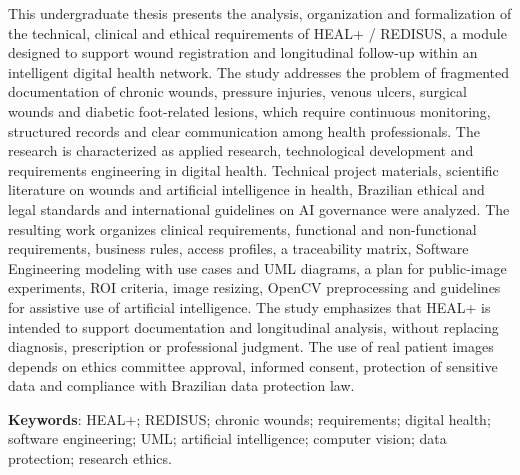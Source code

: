 \documentclass[
    12pt,
    oneside,
    a4paper,
    chapter=TITLE,
    brazil,
    sumario=tradicional,
    hidelinks
]{abntex2}
\begin{document}
\begin{resumo}[Abstract]
This undergraduate thesis presents the analysis, organization and formalization of the technical, clinical and ethical requirements of HEAL+ / REDISUS, a module designed to support wound registration and longitudinal follow-up within an intelligent digital health network. The study addresses the problem of fragmented documentation of chronic wounds, pressure injuries, venous ulcers, surgical wounds and diabetic foot-related lesions, which require continuous monitoring, structured records and clear communication among health professionals. The research is characterized as applied research, technological development and requirements engineering in digital health. Technical project materials, scientific literature on wounds and artificial intelligence in health, Brazilian ethical and legal standards and international guidelines on AI governance were analyzed. The resulting work organizes clinical requirements, functional and non-functional requirements, business rules, access profiles, a traceability matrix, Software Engineering modeling with use cases and UML diagrams, a plan for public-image experiments, ROI criteria, image resizing, OpenCV preprocessing and guidelines for assistive use of artificial intelligence. The study emphasizes that HEAL+ is intended to support documentation and longitudinal analysis, without replacing diagnosis, prescription or professional judgment. The use of real patient images depends on ethics committee approval, informed consent, protection of sensitive data and compliance with Brazilian data protection law.

\textbf{Keywords}: HEAL+; REDISUS; chronic wounds; requirements; digital health; software engineering; UML; artificial intelligence; computer vision; data protection; research ethics.
\end{resumo}
\end{document}

